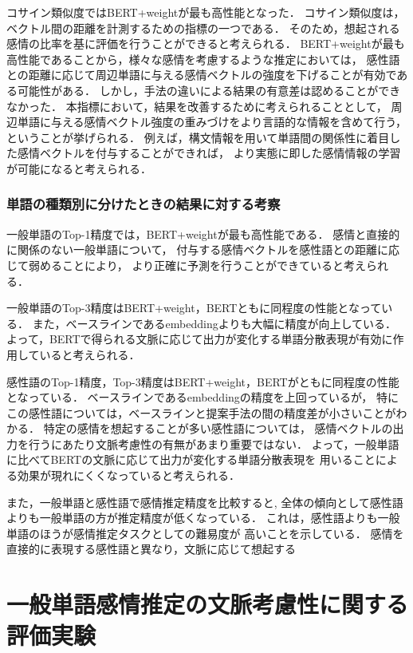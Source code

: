 			コサイン類似度ではBERT+weightが最も高性能となった．
			コサイン類似度は，ベクトル間の距離を計測するための指標の一つである．
			そのため，想起される感情の比率を基に評価を行うことができると考えられる．
			BERT+weightが最も高性能であることから，様々な感情を考慮するような推定においては，
			感性語との距離に応じて周辺単語に与える感情ベクトルの強度を下げることが有効である可能性がある．
			しかし，手法の違いによる結果の有意差は認めることができなかった．
			本指標において，結果を改善するために考えられることとして，
			周辺単語に与える感情ベクトル強度の重みづけをより言語的な情報を含めて行う，
			ということが挙げられる．
			例えば，構文情報を用いて単語間の関係性に着目した感情ベクトルを付与することができれば，
			より実態に即した感情情報の学習が可能になると考えられる．			
			
		\subsubsection{単語の種類別に分けたときの結果に対する考察}
			一般単語のTop-1精度では，BERT+weightが最も高性能である．
			感情と直接的に関係のない一般単語について，
			付与する感情ベクトルを感性語との距離に応じて弱めることにより，
			より正確に予測を行うことができていると考えられる．

			一般単語のTop-3精度はBERT+weight，BERTともに同程度の性能となっている．
			また，ベースラインであるembeddingよりも大幅に精度が向上している．
			よって，BERTで得られる文脈に応じて出力が変化する単語分散表現が有効に作用していると考えられる．

			感性語のTop-1精度，Top-3精度はBERT+weight，BERTがともに同程度の性能となっている．
			ベースラインであるembeddingの精度を上回っているが，
			特にこの感性語については，ベースラインと提案手法の間の精度差が小さいことがわかる．
			特定の感情を想起することが多い感性語については，
			感情ベクトルの出力を行うにあたり文脈考慮性の有無があまり重要ではない．
			よって，一般単語に比べてBERTの文脈に応じて出力が変化する単語分散表現を
			用いることによる効果が現れにくくなっていると考えられる．

			また，一般単語と感性語で感情推定精度を比較すると,
			全体の傾向として感性語よりも一般単語の方が推定精度が低くなっている．
			これは，感性語よりも一般単語のほうが感情推定タスクとしての難易度が
			高いことを示している．
			感情を直接的に表現する感性語と異なり，文脈に応じて想起する



\section{一般単語感情推定の文脈考慮性に関する評価実験}
